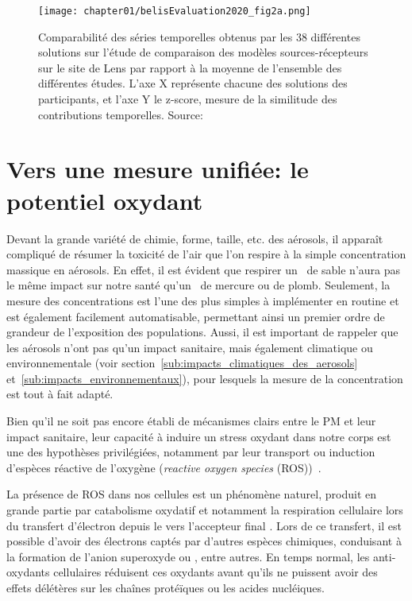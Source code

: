 \begin{figure}[ht]
    \centering
    \texttt{[image: chapter01/belisEvaluation2020\_fig2a.png]}
    \caption{Comparabilité des séries temporelles obtenus par les 38 différentes solutions
    sur l'étude de comparaison des modèles sources-récepteurs sur le site de Lens par
    rapport à la moyenne de l'ensemble des différentes études. L'axe X représente chacune des
    solutions des participants, et l'axe Y le z-score, mesure de la similitude des
contributions temporelles. Source: \textcite{belisEvaluation2020}}%
    \label{fig:chapter01/belisEvaluation2020_fig2a}
\end{figure}

\section{Vers une mesure unifiée: le potentiel oxydant}%
\label{sec:le_potentiel_oxydant_des_aerosols}

Devant la grande variété de chimie, forme, taille, etc. des aérosols, il apparaît
compliqué de résumer la toxicité de l'air que l'on respire à la simple concentration
massique en aérosols. En effet, il est évident que respirer un~\si{\ugm} de sable n'aura
pas le même impact sur notre santé qu'un~\si{\ugm} de mercure ou de plomb.  Seulement, la
mesure des concentrations est l'une des plus simples à implémenter en routine et est également
facilement automatisable, permettant ainsi un premier ordre de grandeur de l'exposition
des populations. Aussi, il est important de rappeler que les aérosols n'ont pas qu'un
impact sanitaire, mais également climatique ou environnementale (voir
section~\ref{sub:impacts_climatiques_des_aerosols} et~\ref{sub:impacts_environnementaux}),
pour lesquels la mesure de la concentration est tout à fait adapté.

Bien qu'il ne soit pas encore établi de mécanismes clairs entre le PM et leur impact
sanitaire, leur capacité à induire un stress oxydant dans notre corps est une des
hypothèses privilégiées, notamment par leur transport ou induction d'espèces réactive de
l'oxygène (\textit{reactive oxygen species}
(ROS))~\autocite{squadritoQuinoid2001,liParticulate2003a,liUltrafine2003,gonzalez-flechaOxidant2004}.

La présence de ROS dans nos cellules est un phénomène naturel, produit en grande partie
par catabolisme oxydatif et notamment la respiration cellulaire lors du transfert
d'électron depuis le  vers l'accepteur final . Lors de ce transfert, il est
possible d'avoir des électrons captés par d'autres espèces chimiques, conduisant à la
formation de l'anion superoxyde  ou , entre autres.
En temps normal, les anti-oxydants cellulaires réduisent ces oxydants avant qu'ils ne
puissent avoir des effets délétères sur les chaînes protéïques ou les acides nucléiques.

